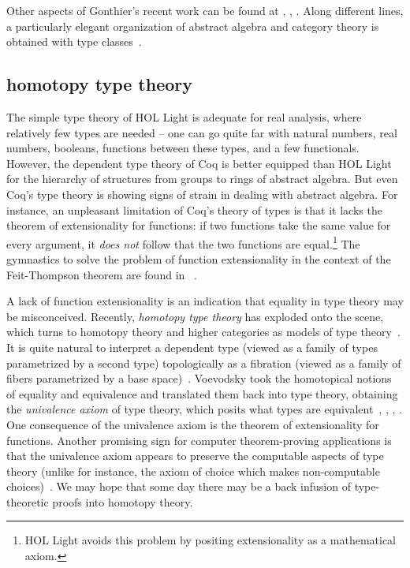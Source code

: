 \documentclass{llncs}
\begin{document}
Other aspects of Gonthier's recent work can be found at
\cite{gonPFSF}, \cite{gonPMS}, \cite{gonC}.
Along different lines, a particularly elegant organization of abstract
algebra and category theory is obtained with type
classes~\cite{SpE11}.

\subsection{homotopy type theory}

The simple type theory of HOL Light is adequate for real analysis,
where relatively few types are needed -- one can go quite far with
natural numbers, real numbers, booleans, functions between these
types, and a few functionals.  However, the dependent type theory of
Coq is better equipped than HOL Light for the hierarchy of structures
from groups to rings of abstract algebra.  But even
Coq's type theory is showing signs of strain in dealing with abstract
algebra.  For instance, an unpleasant limitation of Coq's theory of
types is that it lacks the theorem of extensionality for functions: if
two functions take the same value for every argument, it {\it does
  not} follow that the two functions are equal.\footnote{HOL Light
  avoids this problem by positing extensionality as a mathematical axiom.}  The
gymnastics to solve the problem of function extensionality in the
context of the Feit-Thompson theorem are found in ~\cite{gonMF}.

A lack of function extensionality is an indication
that equality in type theory may be misconceived. Recently, {\it
  homotopy type theory} has exploded onto the scene, which turns to
homotopy theory and higher categories as models of type
theory~\cite{htt}.  It is quite natural to interpret a dependent type
(viewed as a family of types parametrized by a second type)
topologically as a fibration (viewed as a family of fibers
parametrized by a base space)~\cite{AW09}. Voevodsky took the
homotopical notions of equality and equivalence and translated them
back into type theory, obtaining the {\it univalence axiom} of type
theory, which posits what types are equivalent~\cite{VV11}, \cite{PW12}, 
\cite{KLV12}, \cite{KLV12a}.  One
consequence of the univalence axiom is the theorem of extensionality
for functions.  Another promising sign for computer theorem-proving
applications is that the univalence axiom appears to preserve the
computable aspects of type theory (unlike for instance, the axiom of
choice which makes non-computable choices)~\cite{LH11}.  We may hope
that some day there may be a back infusion of type-theoretic proofs
into homotopy theory.
\end{document}
